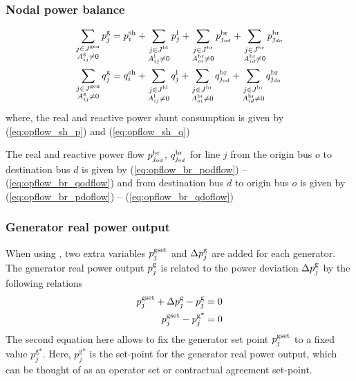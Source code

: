 \subsubsection{Nodal power balance}
\begin{align}
\sum_{\substack{j \in J^\text{gen} \\ A^{\text{g}}_{ij} \neq 0}} p^\text{g}_j &=   p^{\text{sh}}_i + \sum_{\substack{j \in J^\text{ld} \\ A^{\text{l}}_{ij} \neq 0}} p^{\text{l}}_j + \sum_{\substack{j \in J^\text{br} \\ A^{\text{br}}_{oi} \neq 0}} p^\text{br}_{j_{od}} + \sum_{\substack{j \in J^\text{br} \\ A^{\text{br}}_{id} \neq 0}} p^\text{br}_{j_{do}} \\
\sum_{\substack{j \in J^\text{gen} \\ A^{\text{g}}_{ij} \neq 0}} q^\text{g}_j &=  q^{\text{sh}}_i + \sum_{\substack{j \in J^\text{ld} \\ A^{\text{l}}_{ij} \neq 0}} q^{\text{l}}_j +
\sum_{\substack{j \in J^\text{br} \\ A^{\text{br}}_{oi} \neq 0}} q^\text{br}_{j_{od}} + \sum_{\substack{j \in J^\text{br} \\ A^{\text{br}}_{id} \neq 0}} q^\text{br}_{j_{do}} \\
\end{align}
where, the real and reactive power shunt consumption is given by (\ref{eq:opflow_sh_p}) and (\ref{eq:opflow_sh_q})


The real and reactive power flow $p^\text{br}_{j_{od}}$, $q^\text{br}_{j_{od}}$ for line $j$ from the origin bus $o$ to destination bus $d$ is given by (\ref{eq:opflow_br_podflow}) -- 
 (\ref{eq:opflow_br_qodflow})
and from destination bus $d$ to origin bus $o$ is given by (\ref{eq:opflow_br_pdoflow}) -- 
 (\ref{eq:opflow_br_qdoflow})

\subsubsection{Generator real power output}

When using \option{\opflowgensetpoint}, two extra variables $p^{\text{gset}}_j$ and $\Delta{p}^\text{g}_j$ are added for each generator. The generator real power output $p^\text{g}_j$ is related to the power deviation $\Delta{p}^\text{g}_j$ by the following relations
\begin{align}
  p^{\text{gset}}_j + \Delta{p}^\text{g}_j - p^\text{g}_j = 0 \\
  p^{\text{gset}}_j - p^{\text{g*}}_j = 0
\end{align}
The second equation here allows to fix the generator set point $p^{\text{gset}}_j$ to a fixed value $p^{\text{g*}}_j$. Here, $p^{\text{g*}}_j$ is the set-point for the generator real power output, which can be thought of as an operator set or contractual agreement set-point.

